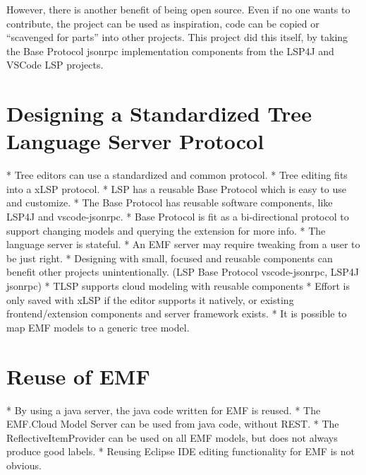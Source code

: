 However, there is another benefit of being \gls{open source}.
Even if no one wants to contribute, the project can be used as inspiration, code can be copied or ``scavenged for parts'' into other projects.
This project did this itself, by taking the Base Protocol jsonrpc implementation components from the LSP4J and VSCode LSP projects.


\section{Designing a Standardized Tree Language Server Protocol}
* Tree editors can use a standardized and common protocol.
* Tree editing fits into a xLSP protocol.
* LSP has a reusable Base Protocol which is easy to use and customize.
* The Base Protocol has reusable software components, like LSP4J and vscode-jsonrpc.
* Base Protocol is fit as a bi-directional protocol to support changing models and querying the extension for more info.
* The language server is stateful.
* An EMF server may require tweaking from a user to be just right.
* Designing with small, focused and reusable components can benefit other projects unintentionally. (LSP Base Protocol vscode-jsonrpc, LSP4J jsonrpc)
* TLSP supports cloud modeling with reusable components
* Effort is only saved with xLSP if the editor supports it natively, or existing frontend/extension components and server framework exists.
* It is possible to map EMF models to a generic tree model.

\section{Reuse of EMF}
* By using a java server, the java code written for EMF is reused.
* The EMF.Cloud Model Server can be used from java code, without REST.
* The ReflectiveItemProvider can be used on all \acrshort{EMF} models, but does not always produce good labels.
* Reusing Eclipse IDE editing functionality for EMF is not obvious.
